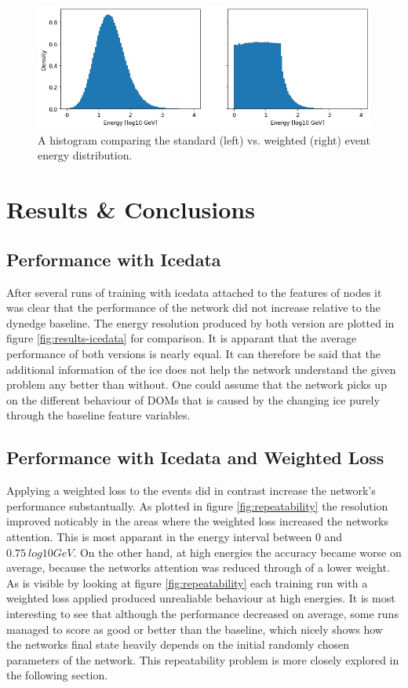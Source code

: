 \documentclass[a4paper,10pt]{scrartcl}
\begin{document}
\begin{figure}[h]
    \includegraphics[width=\textwidth]{images/loss-weights.jpg}
    \centering
    \caption{A histogram comparing the standard (left) vs. weighted (right) event energy distribution.}
\end{figure}


\section{Results \& Conclusions}

\subsection{Performance with Icedata}

After several runs of training with icedata attached to the features of nodes it was clear that the performance of the network did not increase relative to the dynedge baseline.
The energy resolution produced by both version are plotted in figure \ref{fig:results-icedata} for comparison.
It is apparant that the average performance of both versions is nearly equal.
It can therefore be said that the additional information of the ice does not help the network understand the given problem any better than without.
One could assume that the network picks up on the different behaviour of DOMs that is caused by the changing ice purely through the baseline feature variables.

\subsection{Performance with Icedata and Weighted Loss}

Applying a weighted loss to the events did in contrast increase the network's performance substantually.
As plotted in figure \ref{fig:repeatability} the resolution improved noticably in the areas where the weighted loss increased the networks attention.
This is most apparant in the energy interval between $0$ and $\SI{0.75}{log10 GeV}$.
On the other hand, at high energies the accuracy became worse on average, because the networks attention was reduced through of a lower weight.
As is visible by looking at figure \ref{fig:repeatability} each training run with a weighted loss applied produced unrealiable behaviour at high energies.
It is most interesting to see that although the performance decreased on average, some runs managed to score as good or better than the baseline, which nicely shows how the networks final state heavily depends on the initial randomly chosen parameters of the network.
This repeatability problem is more closely explored in the following section.
\end{document}
